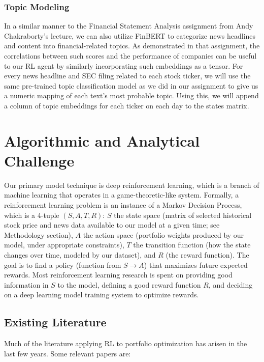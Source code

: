 \subsubsection{Topic Modeling}

In a similar manner to the Financial Statement Analysis assignment from 
Andy Chakraborty’s lecture, we can also utilize FinBERT to categorize news 
headlines and content into financial-related topics. As demonstrated in that 
assignment, the correlations between such scores and the performance of 
companies can be useful to our RL agent by similarly incorporating such 
embeddings as a tensor. For every news headline and SEC filing related to 
each stock ticker, we will use the same pre-trained topic classification model 
as we did in our assignment to give us a numeric mapping of each text’s most 
probable topic. Using this, we will append a column of topic embeddings for 
each ticker on each day to the states matrix.

\section{Algorithmic and Analytical Challenge}

Our primary model technique is deep reinforcement learning, which is a 
branch of machine learning that operates in a game-theoretic-like system. 
Formally, a reinforcement learning problem is an instance of a Markov 
Decision Process, which is a 4-tuple $(S, A, T, R)$: $S$ the state space 
(matrix of selected historical stock price and news data available to 
our model at a given time; see Methodology section), $A$ the action space 
(portfolio weights produced by our model, under appropriate constraints), 
$T$ the transition function (how the state changes over time, modeled by our dataset), 
and $R$ (the reward function). The goal is to find a policy (function from $S \to A$) 
that maximizes future expected rewards. Most reinforcement learning research is 
spent on providing good information in $S$ to the model, defining a good reward 
function $R$, and deciding on a deep learning model training system to optimize rewards.

\subsection{Existing Literature}

Much of the literature applying RL to portfolio optimization has arisen in the 
last few years. Some relevant papers are:

